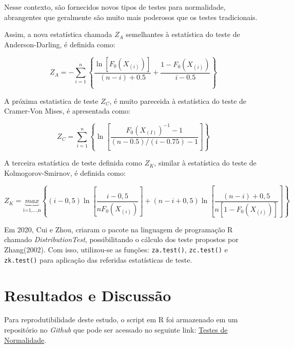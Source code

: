\documentclass[a4paper,11pt]{article} %
\begin{document}
\vspace{0.5cm}

Nesse contexto, são fornecidos novos tipos de testes para normalidade, abrangentes que geralmente são muito mais poderosos que os testes tradicionais.

\vspace{0.5cm}

Assim, a nova estatística chamada $Z_{A}$ semelhantes à estatística do teste de Anderson-Darling, é definida como:

\begin{equation}
    Z_{A} = - \sum_{i=1}^{n} \left\{  \frac{ \ln[F_{0}(X_{(i)})]}{(n-i)+0.5} + \frac{1-F_{0}(X_{(i)})}{i-0.5}  \right\}  
\end{equation}

A próxima estatistica de teste $Z_{C}$, é muito pareceida à estatística do teste de Cramer-Von Mises, é apresentada como:

\begin{equation}
    Z_{C} = \sum_{i=1}^{n}  \left\{ \ln\left[ \frac{F_{0}(X_{(I)})^{-1}-1}{(n-0.5)/(i-0.75)-1} \right] \right\}
\end{equation}

A terceira estatística de teste definida como $Z_{K}$, similar à estatística do teste de Kolmogorov-Smirnov, é definida como:

\begin{equation}
Z_{K} = \underbrace{max}_{\mbox{i=1,...,n}} \left\{(i - 0,5) \ln\left[ \frac{i - 0,5}{n F_{0}(X_{(i)})} \right] + (n - i + 0,5) \ln\left[ \dfrac{(n - i) + 0,5}{n[1 - F_{0}(X_{(i)})]} \right] \right\}
\end{equation}

Em 2020, Cui e Zhou, criaram o pacote na linguagem de programação R chamado \textit{DistributionTest}, possibilitando o cálculo dos teste propostos por Zhang(2002). Com isso,  utilizou-se as funções: \texttt{za.test()}, \texttt{zc.test()} e \texttt{zk.test()} para aplicação das referidas estatísticas de teste.


\section{Resultados e Discussão}

Para reprodutibilidade deste estudo, o script em R foi armazenado em um repositório no \textit{Github} que pode ser acessado no seguinte link: \href{https://github.com/MarioDhiego/Teste\_Normalidade}{Testes de Normalidade}.
\end{document}
